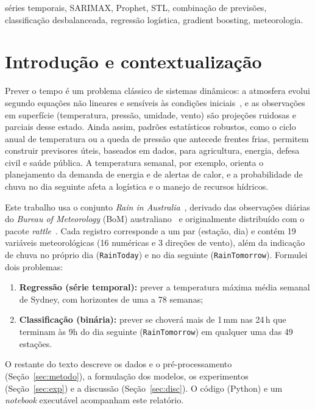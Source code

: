 \documentclass[conference,a4paper]{IEEEtran}
\begin{document}
\begin{IEEEkeywords}
séries temporais, SARIMAX, Prophet, STL, combinação de previsões, classificação desbalanceada,
regressão logística, gradient boosting, meteorologia.
\end{IEEEkeywords}

\section{Introdução e contextualização}

Prever o tempo é um problema clássico de sistemas dinâmicos: a atmosfera evolui segundo
equações não lineares e sensíveis às condições iniciais~\cite{lorenz1963deterministic}, e as observações em superfície (temperatura, pressão, umidade, vento)
são projeções ruidosas e parciais desse estado. Ainda assim, padrões estatísticos robustos,
como o ciclo anual de temperatura ou a queda de pressão que antecede frentes frias, permitem
construir previsores úteis, baseados em dados, para agricultura, energia, defesa civil e saúde
pública. A temperatura semanal, por exemplo, orienta o planejamento da demanda de energia e de
alertas de calor, e a probabilidade de chuva no dia seguinte afeta a logística e o manejo de recursos hídricos.

Este trabalho usa o conjunto \textit{Rain in Australia}~\cite{kaggle_weatheraus}, derivado das
observações diárias do \textit{Bureau of Meteorology} (BoM) australiano~\cite{bom_climate}
e originalmente distribuído com o pacote \textit{rattle}~\cite{williams2011rattle}. Cada
registro corresponde a um par (estação, dia) e contém 19 variáveis meteorológicas (16 numéricas e 3 direções de vento), além da
indicação de chuva no próprio dia (\texttt{RainToday}) e no dia seguinte (\texttt{RainTomorrow}). Formulei dois problemas:
\begin{enumerate}
\item \textbf{Regressão (série temporal):} prever a temperatura máxima média semanal de Sydney,
com horizontes de uma a 78 semanas;
\item \textbf{Classificação (binária):} prever se choverá mais de 1\,mm nas 24\,h que terminam às 9h do dia seguinte
(\texttt{RainTomorrow}) em qualquer uma das 49 estações.
\end{enumerate}
O restante do texto descreve os dados e o pré-processamento (Seção~\ref{sec:metodo}), a
formulação dos modelos, os experimentos (Seção~\ref{sec:exp}) e a discussão (Seção~\ref{sec:disc}).
O código (Python) e um \textit{notebook} executável acompanham este relatório.
\end{document}
